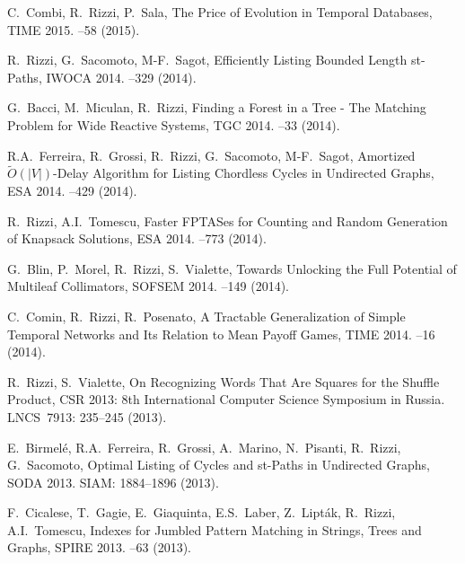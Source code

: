 \begin{etaremune}
  \item {\sc C.~Combi, R.~Rizzi, P.~Sala},
   \newblock The Price of Evolution in Temporal Databases,
   \newblock TIME 2015.
   --58 (2015).

  \item {\sc R.~Rizzi, G.~Sacomoto, M-F.~Sagot},
   \newblock Efficiently Listing Bounded Length st-Paths,
   \newblock IWOCA 2014.
   --329 (2014).

  \item {G.~Bacci, M.~Miculan, R.~Rizzi},
   \newblock Finding a Forest in a Tree - The Matching Problem for Wide Reactive Systems,
   \newblock TGC 2014.
   --33 (2014).

  \item {R.A.~Ferreira, R.~Grossi, R.~Rizzi, G.~Sacomoto, M-F.~Sagot},
   \newblock Amortized $\tilde{O}(|V|)$-Delay Algorithm for Listing Chordless Cycles in Undirected Graphs,
   \newblock ESA 2014.
   --429 (2014).

  \item {R.~Rizzi, A.I.~Tomescu},
   \newblock Faster FPTASes for Counting and Random Generation of Knapsack Solutions,
   \newblock ESA 2014.
   --773 (2014).

  \item {G.~Blin, P.~Morel, R.~Rizzi, S.~Vialette},
   \newblock Towards Unlocking the Full Potential of Multileaf Collimators,
   \newblock SOFSEM 2014.
   --149 (2014).

  \item {C.~Comin, R.~Rizzi, R.~Posenato},
   \newblock A Tractable Generalization of Simple Temporal Networks and Its Relation to Mean Payoff Games,
   \newblock TIME 2014.
   --16 (2014).

  \item {R.~Rizzi, S.~Vialette},
   \newblock On Recognizing Words That Are Squares for the Shuffle Product,
   \newblock CSR 2013: 8th International Computer Science Symposium in Russia.
   \newblock LNCS~7913: 235--245 (2013).

  \item {E.~Birmel\'e, R.A.~Ferreira, R.~Grossi, A.~Marino, N.~Pisanti, R.~Rizzi, G.~Sacomoto},
   \newblock Optimal Listing of Cycles and st-Paths in Undirected Graphs,
   \newblock SODA 2013.
   \newblock SIAM: 1884--1896 (2013).

  \item {F.~Cicalese, T.~Gagie, E.~Giaquinta, E.S.~Laber, Z.~Lipt\'ak, R.~Rizzi, A.I.~Tomescu},
   \newblock Indexes for Jumbled Pattern Matching in Strings, Trees and Graphs,
   \newblock SPIRE 2013.
   --63 (2013).


\end{etaremune}
